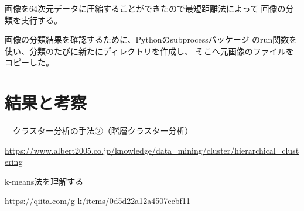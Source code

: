 \documentclass[dvipdfmx]{jsarticle}
\begin{document}
画像を64次元データに圧縮することができたので最短距離法によって
画像の分類を実行する。

画像の分類結果を確認するために、Pythonのsubprocessパッケージ
のrun関数を使い、分類のたびに新たにディレクトリを作成し、
そこへ元画像のファイルをコピーした。

\section{結果と考察}

\begin{thebibliography}{10}
  　クラスター分析の手法②（階層クラスター分析）

  \url{https://www.albert2005.co.jp/knowledge/data_mining/cluster/hierarchical_clustering}

   k-means法を理解する

  \url{https://qiita.com/g-k/items/0d5d22a12a4507ecbf11}
\end{thebibliography}
\end{document}
